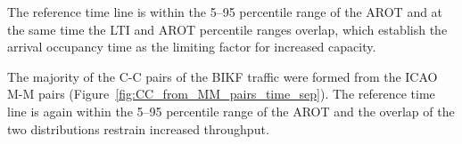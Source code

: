 The reference time line is within the 5--95 percentile range of the AROT and at the same time the LTI and AROT percentile ranges overlap, which establish the arrival occupancy time as the limiting factor for increased capacity.


The majority of the C-C pairs of the BIKF traffic were formed from the ICAO M-M pairs (Figure~\ref{fig:CC_from_MM_pairs_time_sep}). The reference time line is again within the 5--95 percentile range of the AROT and the overlap of the two distributions restrain increased throughput.

\begin{figure}[h]
    \centering
    
    

\end{figure}
